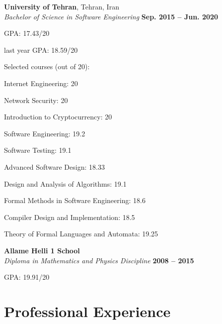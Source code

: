 \documentclass[line, mm]{sampleCV}
\begin{document}
\begin{resume}
\begin{list2}
	
    \item \textbf{University of Tehran}, Tehran, Iran \vspace{2mm}\\\vspace{1mm}
    \textsl{Bachelor of Science in Software Engineering} \hfill \textbf{ Sep. 2015 -- Jun. 2020}\vspace{-3mm}\\\vspace{-1mm}%
    \begin{list2}
        \item GPA: 17.43/20
       	\item last year GPA: 18.59/20
		\item Selected courses (out of 20): 
		\begin{list2}
		\item Internet Engineering: 20			
		\item Network Security: 20
		\item Introduction to Cryptocurrency: 20
		\item Software Engineering: 19.2
		\item Software Testing: 19.1
		\item Advanced Software Design: 18.33
		\item Design and Analysis of Algorithms: 19.1    
		\item Formal Methods in Software Engineering: 18.6
		\item Compiler Design and Implementation: 18.5
		\item Theory of Formal Languages and Automata: 19.25
		\end{list2}
    \end{list2}


\item \textbf{Allame Helli 1 School} \vspace{2mm}\\\vspace{1mm}
\textsl{Diploma in Mathematics and Physics Discipline} \hfill \textbf{ 2008 -- 2015}%
 \begin{list2}
	\item GPA: 19.91/20 \
	\end{list2}
\end{list2}
	
\section{\mysidestyle Professional Experience}


\end{resume}
\end{document}
